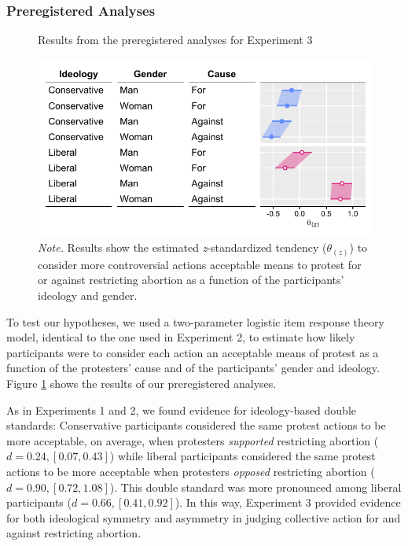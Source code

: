 \documentclass[twocolumn, 11pt, letterpaper]{article}
\begin{document}
\hypertarget{preregistered-analyses-2}{%
\subsubsection{Preregistered Analyses}\label{preregistered-analyses-2}}

\begin{figure}[!t]
\centering
\caption{Results from the preregistered analyses for Experiment 3}
\includegraphics[scale=1]{../Experiment 3/figures/figure-6}
\caption*{\textit{Note.} Results show the estimated \textit{z}-standardized tendency ($\theta_{(z)}$) to consider more controversial actions acceptable means to protest for or against restricting abortion as a function of the participants' ideology and gender.}
\label{fig:f6}
\end{figure}

To test our hypotheses, we used a two-parameter logistic item response
theory model, identical to the one used in Experiment 2, to estimate how
likely participants were to consider each action an acceptable means of
protest as a function of the protesters' cause and of the participants'
gender and ideology. Figure \ref{fig:f6} shows the results of our
preregistered analyses.

As in Experiments 1 and 2, we found evidence for ideology-based double
standards: Conservative participants considered the same protest actions
to be more acceptable, on average, when protesters \emph{supported}
restricting abortion (\(d = 0.24, [0.07, 0.43]\)) while liberal
participants considered the same protest actions to be more acceptable
when protesters \emph{opposed} restricting abortion
(\(d = 0.90, [0.72, 1.08]\)). This double standard was more pronounced
among liberal participants (\(d = 0.66, [0.41, 0.92]\)). In this way,
Experiment 3 provided evidence for both ideological symmetry and
asymmetry in judging collective action for and against restricting
abortion.
\end{document}
